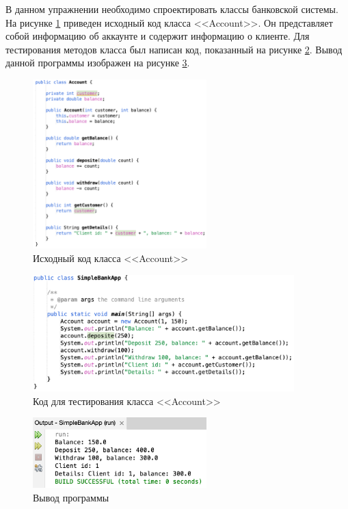 \documentclass[a4paper, 14pt]{extarticle}
\begin{document}
В данном упражнении необходимо спроектировать классы банковской системы. На
рисунке \ref{fig:task-2-1} приведен исходный код класса
<<\foreignlanguage{english}{Account}>>. Он представляет собой информацию об
аккаунте и содержит информацию о клиенте. Для тестирования методов класса был
написан код, показанный на рисунке \ref{fig:task-2-2}. Вывод данной программы
изображен на рисунке \ref{fig:task-2-3}.

\begin{figure}[H]
  \centering
  \includegraphics[width=0.6\textwidth]{images/task-2/1.png}
  \caption{Исходный код класса <<\foreignlanguage{english}{Account}>>}
  \label{fig:task-2-1}
\end{figure}

\begin{figure}[H]
  \centering
  \includegraphics[width=0.9\textwidth]{images/task-2/2.png}
  \caption{Код для тестирования класса <<\foreignlanguage{english}{Account}>>}
  \label{fig:task-2-2}
\end{figure}

\begin{figure}[H]
  \centering
  \includegraphics[width=0.6\textwidth]{images/task-2/3.png}
  \caption{Вывод программы}
  \label{fig:task-2-3}
\end{figure}
\end{document}
